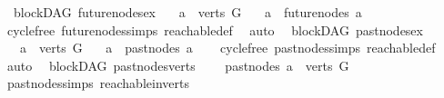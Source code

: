 \begin{isabellebody}
{}
\isamarkuptrue%
%
\endisatagdocument
{\isafolddocument}%
%
\isadelimdocument
%
\endisadelimdocument
{}\isamarkupfalse%
\ {\isacharparenleft}{\kern0pt}\ blockDAG{\isacharparenright}{\kern0pt}\ future{\isacharunderscore}{\kern0pt}nodes{\isacharunderscore}{\kern0pt}ex{\isacharcolon}{\kern0pt}\isanewline
\ \ \ {\isachardoublequoteopen}a\ {\isasymin}\ verts\ G{\isachardoublequoteclose}\isanewline
\ \ \ {\isachardoublequoteopen}a\ {\isasymnotin}\ future{\isacharunderscore}{\kern0pt}nodes\ a{\isachardoublequoteclose}\isanewline
%
\isadelimproof
\ \ %
\endisadelimproof
%
\isatagproof
{}\isamarkupfalse%
\ cycle{\isacharunderscore}{\kern0pt}free\ future{\isacharunderscore}{\kern0pt}nodes{\isachardot}{\kern0pt}simps\ reachable{\isacharunderscore}{\kern0pt}def\ \isamarkupfalse%
\ auto%
\endisatagproof
{\isafoldproof}%
%
\isadelimproof
%
\endisadelimproof
%
\isadelimdocument
%
\endisadelimdocument
%
\isatagdocument
%
\isamarkuptrue%
%
\endisatagdocument
{\isafolddocument}%
%
\isadelimdocument
%
\endisadelimdocument
{}\isamarkupfalse%
\ {\isacharparenleft}{\kern0pt}\ blockDAG{\isacharparenright}{\kern0pt}\ past{\isacharunderscore}{\kern0pt}nodes{\isacharunderscore}{\kern0pt}ex{\isacharcolon}{\kern0pt}\isanewline
\ \ \ {\isachardoublequoteopen}a\ {\isasymin}\ verts\ G{\isachardoublequoteclose}\isanewline
\ \ \ {\isachardoublequoteopen}a\ {\isasymnotin}\ past{\isacharunderscore}{\kern0pt}nodes\ a{\isachardoublequoteclose}\isanewline
%
\isadelimproof
\ \ %
\endisadelimproof
%
\isatagproof
{}\isamarkupfalse%
\ cycle{\isacharunderscore}{\kern0pt}free\ past{\isacharunderscore}{\kern0pt}nodes{\isachardot}{\kern0pt}simps\ reachable{\isacharunderscore}{\kern0pt}def\ \isamarkupfalse%
\ auto%
\endisatagproof
{\isafoldproof}%
%
\isadelimproof
\isanewline
%
\endisadelimproof
\isanewline
{}\isamarkupfalse%
\ {\isacharparenleft}{\kern0pt}\ blockDAG{\isacharparenright}{\kern0pt}\ past{\isacharunderscore}{\kern0pt}nodes{\isacharunderscore}{\kern0pt}verts{\isacharcolon}{\kern0pt}\ \isanewline
\ \ \ {\isachardoublequoteopen}past{\isacharunderscore}{\kern0pt}nodes\ a\ {\isasymsubseteq}\ verts\ G{\isachardoublequoteclose}\isanewline
%
\isadelimproof
\ \ %
\endisadelimproof
%
\isatagproof
{}\isamarkupfalse%
\ past{\isacharunderscore}{\kern0pt}nodes{\isachardot}{\kern0pt}simps\ reachable{}{\isacharunderscore}{\kern0pt}in{\isacharunderscore}{\kern0pt}verts\ \isamarkupfalse%

\end{isabellebody}
